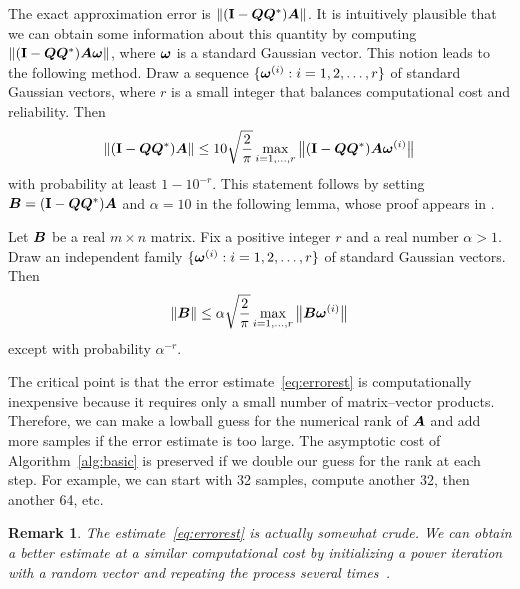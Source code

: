 \documentclass[final]{siamltex}
\newtheorem{remark}{Remark}[section]
\begin{document}
The exact approximation error is $\left\Vert { (\mathbf{I}- \bm{QQ}^*) \bm{A} } \right\Vert$.
It is intuitively plausible that we can obtain some information
about this quantity by computing $\left\Vert { (\mathbf{I}- \bm{QQ}^*) \bm{A}\bm{\omega} } \right\Vert$,
where $\bm{\omega}$ is a standard Gaussian vector.
This notion leads to the following method.
Draw a sequence $\{ \bm{\omega}^{(i)} : i = 1, 2, \dots, r \}$
of standard Gaussian vectors, where $r$ is a small integer
that balances computational cost and reliability.
Then
\begin{equation}
\label{eq:errorest}
\norm{ (\Id - \mtx{Q}\mtx{Q}^{\adj})\mtx{A}}
    \leq 10 \sqrt{\frac{2}{\pi}} \max_{i = 1, \dots, r}
    \smnorm{}{ (\Id - \mtx{Q}\mtx{Q}^{\adj}) \mtx{A}\vct{\omega}^{(i)} }
\end{equation}
with probability at least $1 - 10^{-r}$. This statement follows by setting
$\bm{B} = (\mathbf{I} - \bm{Q}\bm{Q}^{*})\bm{A}$ and $\alpha =
10$ in the following lemma, whose proof appears in
\cite[\S3.4]{random2}.

\lsp

\begin{lemma}
\label{thm:aposteriori}
Let $\bm{B}$ be a real $m\times n$ matrix.
Fix a positive integer $r$ and a real number $\alpha > 1$.
Draw an independent family $\{ \bm{\omega}^{(i)} : i = 1, 2, \dots, r \}$
of standard Gaussian vectors.  Then
\begin{equation*}
\left\Vert {\bm{B}} \right\Vert
    \leq \alpha \sqrt{\frac{2}{\pi}} \max_{i = 1, \dots, r}
    {\bigl\Vert {\bm{B}\bm{\omega}^{(i)} } \bigr\Vert}_{}
\end{equation*}
except with probability $\alpha^{-r}$.
\end{lemma}

\lsp

The critical point is that the error estimate~\eqref{eq:errorest}
is computationally inexpensive because it requires only a
small number of matrix--vector products.  Therefore, we can make
a lowball guess for the numerical rank of $\bm{A}$ and add more
samples if the error estimate is too large.  The asymptotic cost
of Algorithm~\ref{alg:basic} is preserved if we double our guess
for the rank at each step.  For example, we can start with 32 samples,
compute another 32, then another 64, etc.

\lsp

\begin{remark}\rm
\label{remark:better_errorestimate}
The estimate~\eqref{eq:errorest} is actually somewhat crude.
We can obtain a better estimate at a similar computational cost by
initializing a power iteration with a random vector and repeating the process
several times~\cite{2007_PNAS}.
\end{remark}
\end{document}
